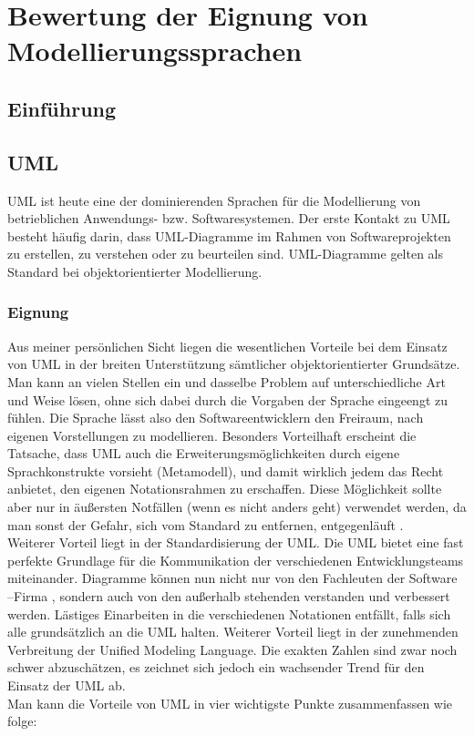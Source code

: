 

\chapter{Bewertung der Eignung von Modellierungssprachen}

\section{Einführung}
\section{UML}
UML ist heute eine der dominierenden Sprachen für die Modellierung von betrieblichen Anwendungs- bzw. Softwaresystemen. Der erste Kontakt zu UML besteht häufig darin, dass UML-Diagramme im Rahmen von Softwareprojekten zu erstellen, zu verstehen oder zu beurteilen sind. UML-Diagramme gelten als Standard bei objektorientierter Modellierung.
\subsection{Eignung}

Aus meiner persönlichen Sicht liegen die wesentlichen Vorteile bei dem Einsatz von UML in der breiten Unterstützung sämtlicher objektorientierter Grundsätze. Man kann an vielen Stellen ein und dasselbe Problem auf unterschiedliche Art und Weise lösen, ohne sich dabei durch die Vorgaben der Sprache eingeengt zu fühlen. Die Sprache lässt also den Softwareentwicklern den Freiraum, nach eigenen Vorstellungen zu modellieren. Besonders Vorteilhaft erscheint die Tatsache, dass UML auch die Erweiterungsmöglichkeiten durch eigene Sprachkonstrukte vorsieht (Metamodell), und damit wirklich jedem das Recht anbietet, den eigenen Notationsrahmen zu erschaffen. Diese Möglichkeit sollte aber nur in äußersten Notfällen (wenn es nicht anders geht) verwendet werden, da man sonst der Gefahr, sich vom Standard zu entfernen, entgegenläuft .\\
Weiterer Vorteil liegt in der Standardisierung der UML. Die  UML bietet eine fast perfekte Grundlage für die Kommunikation der verschiedenen Entwicklungsteams miteinander. Diagramme können nun nicht nur von den Fachleuten der Software –Firma , sondern auch von den außerhalb stehenden verstanden und verbessert werden. Lästiges  Einarbeiten in die verschiedenen Notationen entfällt, falls sich alle grundsätzlich an die UML halten. 
Weiterer Vorteil liegt in der zunehmenden Verbreitung der Unified Modeling Language. Die exakten Zahlen sind zwar noch schwer abzuschätzen, es zeichnet sich jedoch ein wachsender Trend für den Einsatz der UML ab.\\
Man kann die Vorteile von UML in vier wichtigste Punkte zusammenfassen wie folge:\\

